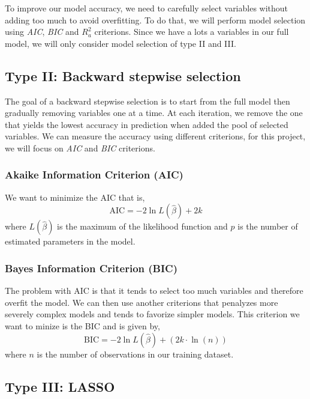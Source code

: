 To improve our model accuracy, we need to carefully select variables without adding too much to avoid overfitting. To do that, we will perform model selection using \textit{AIC}, \textit{BIC} and \textit{$R^2_a$} criterions. Since we have a lots a variables in our full model, we will only consider model selection of type II and III.

\subsection{Type II: Backward stepwise selection}

The goal of a backward stepwise selection is to start from the full model then gradually removing variables one at a time. At each iteration, we remove the one that yields the lowest accuracy in prediction when added the pool of selected variables. We can measure the accuracy using different criterions, for this project, we will focus on \textit{AIC} and \textit{BIC} criterions.

\subsubsection{Akaike Information Criterion (AIC)}

We want to minimize the AIC that is,
\begin{equation}
	\text{AIC} = - 2 \ln L(\hat{\beta}) + 2k
\end{equation} 
where $L(\hat{\beta})$ is the maximum of the likelihood function and $p$ is the number of estimated parameters in the model.

\subsubsection{Bayes Information Criterion (BIC)}

The problem with AIC is that it tends to select too much variables and therefore overfit the model. We can then use another criterions that penalyzes more severely complex models and tends to favorize simpler models. This criterion we want to minize is the BIC and is given by, 
\begin{equation}
	\text{BIC} = - 2 \ln L(\hat{\beta}) + (2k \cdot \ln(n))
\end{equation}
where $n$ is the number of observations in our training dataset.

\subsection{Type III: LASSO}

